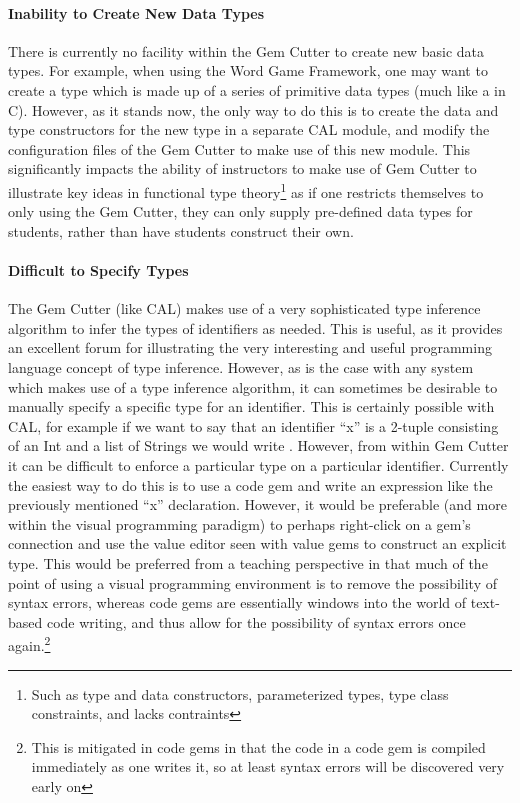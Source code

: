 \paragraph{Inability to Create New Data Types}

There is currently no facility within the Gem Cutter to create new basic data types.  For example, when using the Word Game Framework, one may want to create a  type which is made up of a series of primitive data types (much like a  in C).  However, as it stands now, the only way to do this is to create the data and type constructors for the new type in a separate CAL module, and modify the configuration files of the Gem Cutter to make use of this new module.  This significantly impacts the ability of instructors to make use of Gem Cutter to illustrate key ideas in functional type theory\footnote{Such as type and data constructors, parameterized types, type class constraints, and lacks contraints} as if one restricts themselves to only using the Gem Cutter, they can only supply pre-defined data types for students, rather than have students construct their own.

\paragraph{Difficult to Specify Types}

The Gem Cutter (like CAL) makes use of a very sophisticated type inference algorithm to infer the types of identifiers as needed.  This is useful, as it provides an excellent forum for illustrating the very interesting and useful programming language concept of type inference.  However, as is the case with any system which makes use of a type inference algorithm, it can sometimes be desirable to manually specify a specific type for an identifier.  This is certainly possible with CAL, for example if we want to say that an identifier ``x'' is a 2-tuple consisting of an Int and a list of Strings we would write .  However, from within Gem Cutter it can be difficult to enforce a particular type on a particular identifier.  Currently the easiest way to do this is to use a code gem and write an expression like the previously mentioned ``x'' declaration.  However, it would be preferable (and more within the visual programming paradigm) to perhaps right-click on a gem's connection and use the value editor seen with value gems to construct an explicit type.  This would be preferred from a teaching perspective in that much of the point of using a visual programming environment is to remove the possibility of syntax errors, whereas code gems are essentially windows into the world of text-based code writing, and thus allow for the possibility of syntax errors once again.\footnote{This is mitigated in code gems in that the code in a code gem is compiled immediately as one writes it, so at least syntax errors will be discovered very early on}

